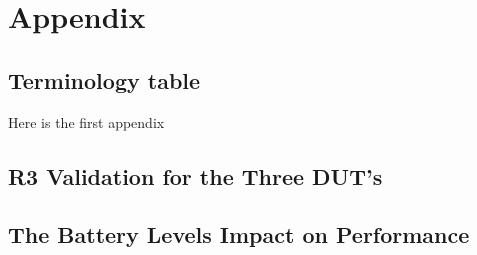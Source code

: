 \chapter{Appendix}\label{ch:appAlabel}

\section{Terminology table}
Here is the first appendix   






\section{R3 Validation for the Three DUT's}\label{app:r3_validation}

% 
% 
% 
% 

% 
% 
% 
% 



\section{The Battery Levels Impact on Performance}\label{app:charge}
% 
% 
% 

